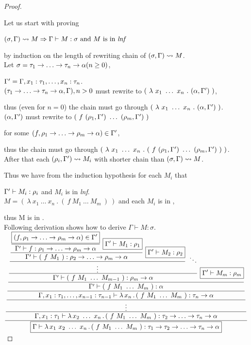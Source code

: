 \documentclass[12pt,a4paper]{report}
\newcommand{\Lets}{Let us\xspace}
\newcommand{\tur}[3]{#1\vdash{}#2:#3}
\newcommand{\turst}[3]{$#1\vdash{}#2:#3$\xspace}
\newcommand{\GMS}{\turst{\Gamma}{M}{\sigma}}
\begin{document}
\begin{proof}~

\Lets start with proving 

$ (\sigma,\Gamma) \garr M 
\then
\tur{\Gamma}{M}{\sigma} \text{ and $M$ is in \textit{lnf}}$

by induction on the length of rewriting chain of $(\sigma,\Gamma) \leadsto M$.\\

Let $\sigma = \tau_1 \ar \dots \ar \tau_n \ar \alpha (n \geq 0)$,

$\Gamma^\prime = \Gamma , x_1:\tau_1 , \dots , x_n:\tau_n$.\\

$(\tau_1 \ar \dots \ar \tau_n \ar \alpha,\Gamma), n>0$ must rewrite to
$(~\lambda~x_1~\dots~x_n~.~( \alpha , \Gamma^\prime )~)$, 

thus (even for $n = 0$) the chain must go through
$(~\lambda~x_1~\dots~x_n~.~( \alpha , \Gamma^\prime )~)$.\\

$(\alpha,\Gamma^\prime)$ must rewrite to 
$(~f~( \rho_1 , \Gamma^\prime )~\dots~( \rho_m , \Gamma^\prime )~)$ 

for some $(f,\rho_1\ar\dots\ar\rho_m\ar\alpha) \in \Gp$,

thus the chain must go through 
$(~\lambda~x_1~\dots~x_n~.~(~f~( \rho_1 , \Gamma^\prime )~\dots~( \rho_m , \Gamma^\prime )~)~)$.\\

After that each $( \rho_i , \Gamma^\prime ) \leadsto M_i$
with shorter chain than $(\sigma,\Gamma) \leadsto M $.

Thus we have from the induction hypothesis for each $M_i$ that
 
$\tur{\Gp}{M_i}{\rho_i}$ and $M_i$ is in \textit{lnf}.\\

$M = (~\lambda~x_1~\dots~x_n~.~(~f~M_1~\dots~M_m~)~)$ 
and each $M_i$ is in \lnf, 

thus M is in \lnf.\\

Following derivation shows how to derive \GMS.\\

$
\ruleI{
\ruleI{ 
\ruleI{
\ruleI{
\ruleIIs{
\ruleIIs{
\ruleIIs{
\ruleIIs{ 
\ruleI
{\boxed{(f,\rho_1\ar\dots\ar\rho_m\ar\alpha) \in \Gp} }
{\tur{\Gp}{f}{\rho_1\ar\dots\ar\rho_m\ar\alpha}}}
{\boxed{
 \tur{\Gp }
     {M_1 }
     {\rho_1 }}}
{
\tur{\Gp}{(~f~M_1~)}{\rho_2\ar\dots\ar\rho_m\ar\alpha} 
}}
{\boxed{
 \tur{\Gp }
     {M_2 }
     {\rho_2 }}}
{\vdots}}
{\ddots}
{\tur{\Gp }
     {(~f~M_1~\dots~M_{m-1}~) }
     {\rho_m \ar \alpha}}}
{\boxed{
 \tur{\Gp }
     {M_m }
     {\rho_m}} }
{\tur{\Gp }
     {(~f~M_1~\dots~M_m~) }
     {\alpha}}}
{\tur{\Gamma,x_1:\tau_1,\dots,x_{n-1}:\tau_{n-1} }
     {\lam{x_n}{(~f~M_1~\dots~M_m~)} }
     {\tau_n \ar \alpha} }}
{\vdots}}
{\tur{\Gamma,x_1:\tau_1 }
       {\lam{x_2~\dots~x_n}{(~f~M_1~\dots~M_m~)} }
       {\tau_2 \ar \dots \ar \tau_n \ar \alpha} } }
{\boxed{
 \tur{\Gamma }
     {\lam{x_1~x_2~\dots~x_n}{(~f~M_1~\dots~M_m~)} }
     {\tau_1 \ar \tau_2 \ar \dots \ar \tau_n \ar \alpha} }}
$


\end{proof}
\end{document}
